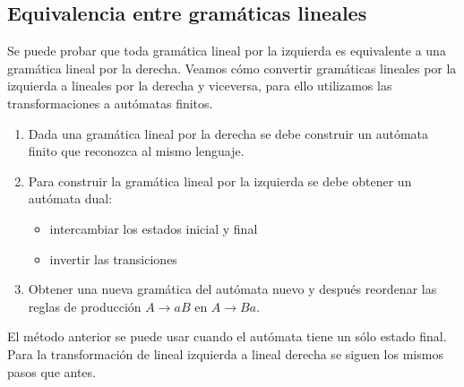 
\subsection{Equivalencia entre gramáticas lineales}
Se puede probar que toda gramática lineal por la izquierda es equivalente a una gramática lineal por la derecha. Veamos cómo convertir gramáticas lineales por la izquierda a lineales por la derecha y viceversa, para ello utilizamos las transformaciones a autómatas finitos.

\begin{enumerate}
    \item Dada una gramática lineal por la derecha se debe construir un autómata finito que reconozca al mismo lenguaje.
    \item Para construir la gramática lineal por la izquierda se debe obtener un autómata dual:
    \begin{itemize}
        \item intercambiar los estados inicial y final
        \item invertir las transiciones
    \end{itemize}
    \item Obtener una nueva gramática del autómata nuevo y después reordenar las reglas de producción $A \rightarrow aB$ en $A \rightarrow Ba$.
\end{enumerate}

El método anterior se puede usar cuando el autómata tiene un sólo estado final. Para la transformación de lineal izquierda a lineal derecha se siguen los mismos pasos que antes.

